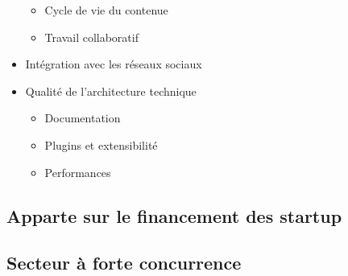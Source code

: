 \documentclass[11pt, a4paper ]{article}
\begin{document}
\begin{itemize}
\begin{itemize}
			\item Cycle de vie du contenue

			\item Travail collaboratif

		\end{itemize}

	\item Intégration avec les réseaux sociaux

	\item Qualité de l'architecture technique
		\begin{itemize}
			\item Documentation

			\item Plugins et extensibilité

			\item Performances

		\end{itemize}

\end{itemize}
		\subsection{Apparte sur le financement des startup}









		\subsection{Secteur à forte concurrence}
\end{document}
